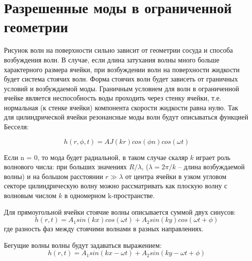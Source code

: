 \section{Разрешенные моды в ограниченной геометрии} %
Рисунок волн на поверхности сильно зависит от геометрии сосуда и способа возбуждения волн.
В случае, если длина затухания волны много больше характерного размера ячейки, при возбуждении волн на поверхности жидкости будет система стоячих волн. Форма стоячих волн будет зависеть от граничных условий и возбуждаемой моды. Граничным условием для волн в ограниченной ячейке является неспособность воды проходить через стенку ячейки, т.е. нормальная (к стенке ячейки) компонента скорости жидкости равна нулю. Так для цилиндрической ячейки резонансные моды волн будут описываться функцией Бесселя:

\begin{equation}
 \label{eq:Bessel}
h(r, \phi, t) = A J(kr) cos(\phi n) cos(\omega t)
\end{equation}

Если n = 0, то мода будет радиальной, в таком случае скаляр $k$ играет роль волнового числа: при больших значениях $R/\lambda$, ($\lambda = 2\pi/k$ – длина возбуждаемой волны) и на большом расстоянии $r \gg \lambda$ от центра ячейки в узком угловом секторе цилиндрическую волну можно рассматривать как плоскую волну с волновым числом $k$ в одномерном k-пространстве.

Для прямоугольной ячейки стоячие волны описывается суммой двух синусов:
\begin{equation}
\label{eq:waveStand}
h(r, t) = A_1 sin(kx)cos(\omega t)+A_2 sin(ky)cos(\omega t+ \phi)
\end{equation}
где \phi разность фаз между стоячими волнами в разных направлениях.

Бегущие волны волны будут задаваться выражением:
\begin{equation}
\label{eq:waveRun}
h(r, t) = A_1 sin(kx-\omega t)+A_2 sin(ky-\omega t+ \phi)
\end{equation}




